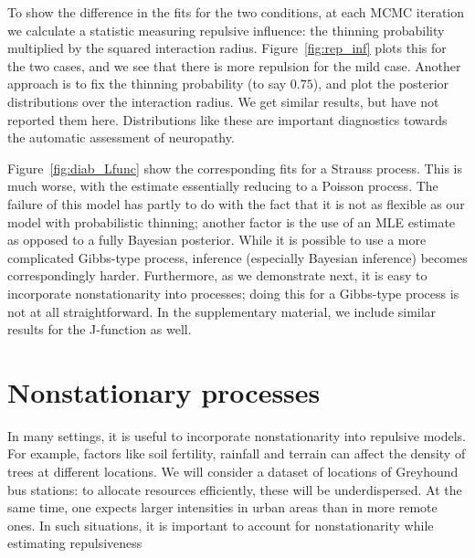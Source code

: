 \documentclass{statsoc}
\begin{document}
To show the difference in the fits for the two conditions, at each MCMC iteration we calculate a statistic measuring repulsive influence: the thinning 
probability multiplied by the squared interaction radius. Figure~\ref{fig:rep_inf} plots this for the two cases, and we see that there is more
repulsion for the mild case. Another approach is to fix the thinning probability (to say $0.75$), and plot the posterior distributions over the
interaction radius. We get similar results, but have not reported them here. Distributions like these are important diagnostics towards
the automatic assessment of neuropathy.

  Figure~\ref{fig:diab_Lfunc} show the corresponding fits for a Strauss process. This is much
  worse, with the estimate essentially reducing to a Poisson process. 
  The failure of this model has partly to do with the fact that it is not as flexible as our \matern model
  with probabilistic thinning; another factor is the use of an MLE estimate as opposed to a fully Bayesian posterior.
  While it is possible to use a more complicated Gibbs-type process, inference (especially Bayesian inference) becomes
  correspondingly harder. Furthermore, as we demonstrate next, it is easy to incorporate nonstationarity into \matern
  processes; doing this for a Gibbs-type process is not at all straightforward. In the supplementary material, we include similar
  results for the J-function as well.

\section{Nonstationary \matern processes}  \label{sec:inhom_mat}
In many settings, it is useful to %
incorporate nonstationarity into repulsive models. %
For example, factors like soil fertility, rainfall and terrain can affect the density of trees at different locations. 
We will consider a dataset of locations of Greyhound bus stations: to allocate resources efficiently, these will be underdispersed.
At the same time, one expects larger intensities in urban areas than in more remote ones.
In such situations, it is important to account for nonstationarity while estimating repulsiveness
\end{document}
